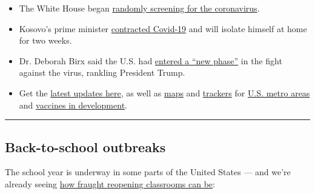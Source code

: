 \begin{itemize}
\item
  The White House began
  \href{https://www.nytimes3xbfgragh.onion/2020/08/03/world/coronavirus-covid-19.html\#link-c4a1d71}{randomly
  screening for the coronavirus}.
\item
  Kosovo's prime minister
  \href{https://www.reuters.com/article/us-health-coronavirus-kosovo-primeminist/kosovo-prime-minister-says-he-has-covid-19-idUSKBN24Y0ON}{contracted
  Covid-19} and will isolate himself at home for two weeks.
\item
  Dr. Deborah Birx said the U.S. had
  \href{https://www.nytimes3xbfgragh.onion/2020/08/03/world/coronavirus-covid-19.html\#link-75107159}{entered
  a ``new phase''} in the fight against the virus, rankling President
  Trump.
\item
  Get the
  \href{https://www.nytimes3xbfgragh.onion/news-event/coronavirus}{latest
  updates here}, as well as
  \href{https://www.nytimes3xbfgragh.onion/interactive/2020/world/asia/china-wuhan-coronavirus-maps.html?action=click\&pgtype=Article\&state=default\&module=styln-coronavirus\&variant=show\&region=TOP_BANNER\&context=storyline_menu}{maps}
  and
  \href{https://www.nytimes3xbfgragh.onion/interactive/2020/04/03/upshot/coronavirus-metro-area-tracker.html}{trackers}
  for
  \href{https://www.nytimes3xbfgragh.onion/interactive/2020/04/03/upshot/coronavirus-metro-area-tracker.html}{U.S.
  metro areas} and
  \href{https://www.nytimes3xbfgragh.onion/interactive/2020/science/coronavirus-vaccine-tracker.html}{vaccines
  in development}.
\end{itemize}

\begin{center}\rule{0.5\linewidth}{\linethickness}\end{center}

\hypertarget{back-to-school-outbreaks}{%
\subsection{Back-to-school outbreaks}\label{back-to-school-outbreaks}}

The school year is underway in some parts of the United States --- and
we're already seeing
\href{https://www.nytimes3xbfgragh.onion/2020/08/03/world/coronavirus-covid-19.html?action=click\&module=Top\%20Stories\&pgtype=Homepage\#link-4c85ed64}{how
fraught reopening classrooms can be}:

